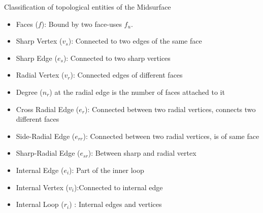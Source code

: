 \begin{frame}{Classification of topological entities of the Midsurface}
	\begin{itemize}[noitemsep,label=\textbullet,topsep=2pt,parsep=2pt,partopsep=2pt] 
	\item Faces ($f$): Bound by two face-uses $f_u$.
	
	\item Sharp Vertex ($v_s$): Connected to two edges of the same face
	\item Sharp Edge ($e_s$): Connected to two sharp vertices

	\item Radial Vertex ($v_{r}$): Connected edges of different faces
	\item Degree ($n_{r}$) at the radial edge is the number of faces attached to it 
	\item Cross Radial Edge ($e_{r}$): Connected between two radial vertices, connects two different faces
	\item Side-Radial  Edge ($e_{rr}$): Connected between two radial vertices, is of same face
	\item Sharp-Radial Edge ($e_{sr}$): Between sharp and radial vertex
	\item Internal Edge ($e_i$): Part of the inner loop
	\item Internal Vertex ($v_i$):Connected to internal edge
	\item Internal Loop ($r_i$) : Internal edges and vertices
	\end{itemize}
\end{frame}



